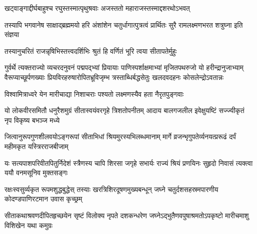 


\storymeta



\twolineshloka
{खट्वाङ्गाद्दीर्घबाहुश्च रघुस्तस्मात्पृथुश्रवाः}
{अजस्ततो महाराजस्तस्माद्दशरथोऽभवत्} %

\threelineshloka
{तस्यापि भगवानेष साक्षाद्ब्रह्ममयो हरि}
{अंशांशेन चतुर्धागात्पुत्रत्वं प्रार्थितः सुरै}
{रामलक्ष्मणभरत शत्रुघ्ना इति संज्ञया} %

\twolineshloka
{तस्यानुचरितं राजन्नृषिभिस्तत्त्वदर्शिभिः}
{श्रुतं हि वर्णितं भूरि त्वया सीतापतेर्मुहुः} %

\fourlineindentedshloka
{गुर्वर्थे त्यक्तराज्यो व्यचरदनुवनं पद्मपद्भ्यां प्रियायाः}
{पाणिस्पर्शाक्षमाभ्यां मृजितपथरुजो यो हरीन्द्रानुजाभ्याम्}
{वैरूप्याच्छूर्पणख्याः प्रियविरहरुषारोपितभ्रूविजृम्भ}
{त्रस्ताब्धिर्बद्धसेतुः खलदवदहनः कोसलेन्द्रोऽवतान्नः} %

\twolineshloka
{विश्वामित्राध्वरे येन मारीचाद्या निशाचराः}
{पश्यतो लक्ष्मणस्यैव हता नैरृतपुङ्गवाः} %

\fourlineindentedshloka
{यो लोकवीरसमितौ धनुरैशमुग्रं}
{सीतास्वयंवरगृहे त्रिशतोपनीतम्}
{आदाय बालगजलील इवेक्षुयष्टिं}
{सज्ज्यीकृतं नृप विकृष्य बभञ्ज मध्ये} %

\fourlineindentedshloka
{जित्वानुरूपगुणशीलवयोऽङ्गरूपां}
{सीताभिधां श्रियमुरस्यभिलब्धमानाम्}
{मार्गे व्रजन्भृगुपतेर्व्यनयत्प्ररूढं}
{दर्पं महीमकृत यस्त्रिरराजबीजाम्} %

\fourlineindentedshloka
{यः सत्यपाशपरिवीतपितुर्निदेशं}
{स्त्रैणस्य चापि शिरसा जगृहे सभार्यः}
{राज्यं श्रियं प्रणयिनः सुहृदो निवासं}
{त्यक्त्वा ययौ वनमसूनिव मुक्तसङ्गः} %

\fourlineindentedshloka
{रक्षःस्वसुर्व्यकृत रूपमशुद्धबुद्धेस्}
{तस्याः खरत्रिशिरदूषणमुख्यबन्धून्}
{जघ्ने चतुर्दशसहस्रमपारणीय}
{कोदण्डपाणिरटमान उवास कृच्छ्रम्} %

\fourlineindentedshloka
{सीताकथाश्रवणदीपितहृच्छयेन}
{सृष्टं विलोक्य नृपते दशकन्धरेण}
{जघ्नेऽद्भुतैणवपुषाश्रमतोऽपकृष्टो}
{मारीचमाशु विशिखेन यथा कमुग्रः} %

